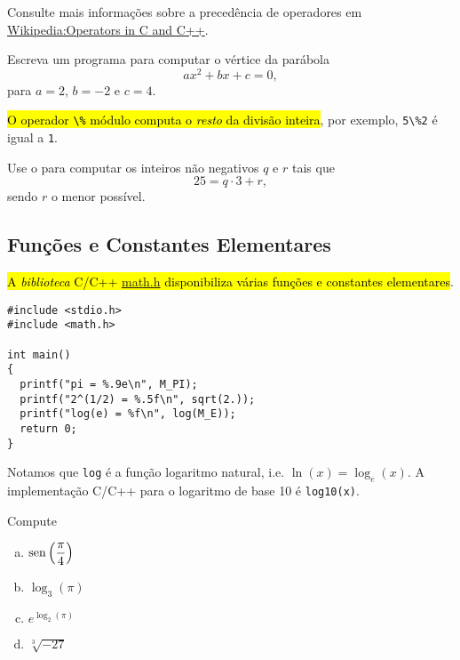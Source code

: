 \documentclass[12pt]{article}
\begin{document}
\begin{obs}
Consulte mais informações sobre a precedência de operadores em \href{https://en.wikipedia.org/wiki/Operators_in_C_and_C\%2B\%2B#Operator_precedence}{Wikipedia:Operators in C and C++}.
\end{obs}

\begin{exer}
  Escreva um programa para computar o vértice da parábola
  \begin{equation}
    ax^2 + bx + c = 0,
  \end{equation}
  para $a = 2$, $b = -2$ e $c = 4$. 
\end{exer}

\hl{O operador {\lstinline+\%+} módulo computa o \emph{resto} da divisão inteira}, por exemplo, \lstinline+5\%2+ é igual a \lstinline+1+.

\begin{exr}
  Use o {\python} para computar os inteiros não negativos $q$ e $r$ tais que
  \begin{equation}
    25 = q\cdot 3 + r,
  \end{equation}
  sendo $r$ o menor possível.
\end{exr}

\subsection{Funções e Constantes Elementares}

\hl{A \emph{biblioteca} C/C++ {\href{https://cplusplus.com/reference/cmath}{math.h}} disponibiliza várias funções e constantes elementares}.
\begin{lstlisting}[caption=mat.cc]
#include <stdio.h>
#include <math.h>

int main()
{
  printf("pi = %.9e\n", M_PI);
  printf("2^(1/2) = %.5f\n", sqrt(2.));
  printf("log(e) = %f\n", log(M_E));
  return 0;
}
\end{lstlisting}

\begin{obs}
  Notamos que \lstinline+log+ é a função logaritmo natural, i.e. $\ln(x) = \log_e(x)$. A implementação C/C++ para o logaritmo de base 10 é \lstinline!log10(x)!.
\end{obs}

\begin{exr}
  Compute
  \begin{enumerate}[a)]
  \item $\displaystyle \operatorname{sen}\left(\frac{\pi}{4}\right)$
  \item $\displaystyle \log_3(\pi)$
  \item $\displaystyle e^{\log_2(\pi)}$
  \item $\displaystyle \sqrt[3]{-27}$
  \end{enumerate}
\end{exr}
\end{document}
